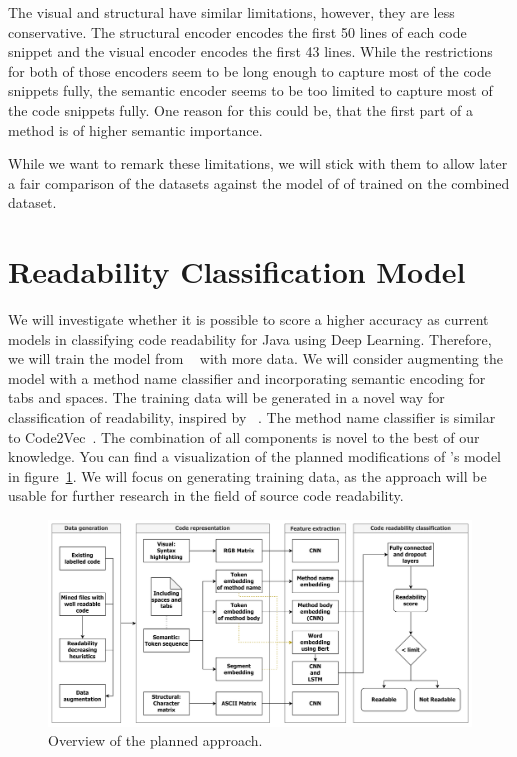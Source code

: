 \documentclass[%
class=scrreprt,
chapterprefix=false,%
open=right,%
twoside=false,%
paper=a4,%
logofile={Logo\_zentral\_farbig\_EN.png},%
thesistype=master,%
UKenglish,%
]{se2thesis}
\begin{document}
	The visual and structural have similar limitations, however, they are less conservative. The structural encoder encodes the first 50 lines of each code snippet and the visual encoder encodes the first 43 lines. While the restrictions for both of those encoders seem to be long enough to capture most of the code snippets fully, the semantic encoder seems to be too limited to capture most of the code snippets fully. One reason for this could be, that the first part of a method is of higher semantic importance.
	
	While we want to remark these limitations, we will stick with them to allow later a fair comparison of the datasets against the model of of \citeauthor{mi2022towards} trained on the combined dataset.	
		
	
\section{Readability Classification Model} \label{Readability Classification Model}
	We will investigate whether it is possible to score a higher accuracy as current models in classifying code readability for Java using Deep Learning. Therefore, we will train the model from \citeauthor{mi2022towards}~\cite{mi2022towards} with more data. We will consider augmenting the model with a method name classifier and incorporating semantic encoding for tabs and spaces. The training data will be generated in a novel way for classification of readability, inspired by \citeauthor{loriot2022styler}~\cite{loriot2022styler}. The method name classifier is similar to Code2Vec~\cite{alon2019code2vec}. The combination of all components is novel to the best of our knowledge. You can find a visualization of the planned modifications of \citeauthor{mi2022towards}'s model in figure~\ref{fig:model_pipeline}. We will focus on generating training data, as the approach will be usable for further research in the field of source code readability.
	
	\begin{figure}[t]
		\centering
		\includegraphics[width=\textwidth]{img/model_pipeline_old.png}
		\caption{Overview of the planned approach.}
		\label{fig:model_pipeline}
	\end{figure}
	
\end{document}

